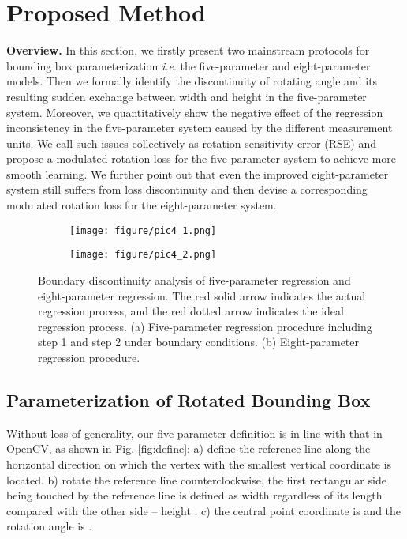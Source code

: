 \documentclass[10pt,twocolumn,letterpaper]{article}
\begin{document}
\section{Proposed Method}
\label{sec:method}
\textbf{Overview.} In this section, we firstly present two mainstream protocols for bounding box parameterization \textit{i.e}. the five-parameter and eight-parameter models.
Then we formally identify the discontinuity of rotating angle and its resulting sudden exchange between width and height in the five-parameter system. Moreover, we quantitatively show the negative effect of the regression inconsistency in the five-parameter system caused by the different measurement units. We call such issues collectively as rotation sensitivity error (RSE) and propose a modulated rotation loss for the five-parameter system to achieve more smooth learning. We further point out that even the improved eight-parameter system still suffers from loss discontinuity and then devise a corresponding modulated rotation loss for the eight-parameter system.      

\begin{figure}[!tb]
    \centering
    \begin{subfigure}{.23\textwidth}
        \centering    \texttt{[image: figure/pic4\_1.png]}
        \caption{}
        \label{fig:ASE1}
    \end{subfigure}
    \begin{subfigure}{.23\textwidth}
        \centering    \texttt{[image: figure/pic4\_2.png]}
        \caption{}
        \label{fig:ASE2}
    \end{subfigure}
    \vspace{-10pt}
    \caption{Boundary discontinuity analysis of five-parameter regression and eight-parameter regression. The red solid arrow indicates the actual regression process, and the red dotted arrow indicates the ideal regression process. (a) Five-parameter regression procedure including step 1 and step 2 under boundary conditions. (b) Eight-parameter regression procedure.}
    \label{fig:ASE}
    \vspace{-10pt}
\end{figure}

\subsection{Parameterization of Rotated Bounding Box}
Without loss of generality, our five-parameter definition is in line with that in OpenCV, as shown in Fig. \ref{fig:define}: a) define the reference line along the horizontal direction on which the vertex with the smallest vertical coordinate is located. b) rotate the reference line counterclockwise, the first rectangular side being touched by the reference line is defined as width  regardless of its length compared with the other side -- height . c) the central point coordinate is  and the rotation angle is .
\end{document}
